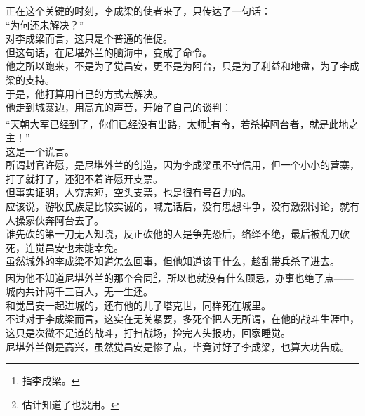 \begin{multicols}{\theparacolNo}
正在这个关键的时刻，李成梁的使者来了，只传达了一句话：\\

“为何还未解决？”\\

对李成梁而言，这只是个普通的催促。\\

但这句话，在尼堪外兰的脑海中，变成了命令。\\

他之所以跑来，不是为了觉昌安，更不是为阿台，只是为了利益和地盘，为了李成梁的支持。\\

于是，他打算用自己的方式去解决。\\

他走到城寨边，用高亢的声音，开始了自己的谈判：\\

“天朝大军已经到了，你们已经没有出路，太师\footnote{指李成梁。}有令，若杀掉阿台者，就是此地之主！”\\

这是一个谎言。\\

所谓封官许愿，是尼堪外兰的创造，因为李成梁虽不守信用，但一个小小的营寨，打了就打了，还犯不着许愿开支票。\\

但事实证明，人穷志短，空头支票，也是很有号召力的。\\

应该说，游牧民族是比较实诚的，喊完话后，没有思想斗争，没有激烈讨论，就有人操家伙奔阿台去了。\\

谁先砍的第一刀无人知晓，反正砍他的人是争先恐后，络绎不绝，最后被乱刀砍死，连觉昌安也未能幸免。\\

虽然城外的李成梁不知道怎么回事，但他知道该干什么，趁乱带兵杀了进去。\\

因为他不知道尼堪外兰的那个合同\footnote{估计知道了也没用。}，所以也就没有什么顾忌，办事也绝了点——城内共计两千三百人，无一生还。\\

和觉昌安一起进城的，还有他的儿子塔克世，同样死在城里。\\

不过对于李成梁而言，这实在无关紧要，多死个把人无所谓，在他的战斗生涯中，这只是次微不足道的战斗，打扫战场，捡完人头报功，回家睡觉。\\

尼堪外兰倒是高兴，虽然觉昌安是惨了点，毕竟讨好了李成梁，也算大功告成。\\


\end{multicols}

